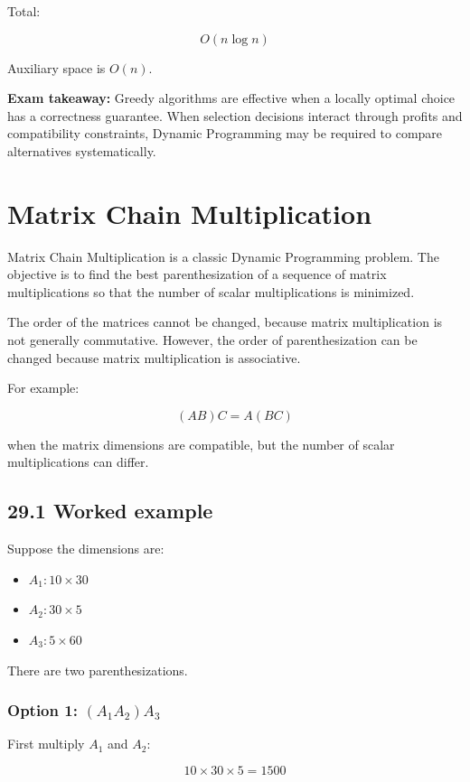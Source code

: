 Total:


\[
\boxed{O(n\log n)}
\]


Auxiliary space is $O(n)$.

\textbf{Exam takeaway:} Greedy algorithms are effective when a locally optimal choice has a correctness guarantee. When selection decisions interact through profits and compatibility constraints, Dynamic Programming may be required to compare alternatives systematically.

\section{Matrix Chain Multiplication}

Matrix Chain Multiplication is a classic Dynamic Programming problem. The objective is to find the best parenthesization of a sequence of matrix multiplications so that the number of scalar multiplications is minimized.

The order of the matrices cannot be changed, because matrix multiplication is not generally commutative. However, the order of parenthesization can be changed because matrix multiplication is associative.

For example:


\[
(AB)C=A(BC)
\]


when the matrix dimensions are compatible, but the number of scalar multiplications can differ.

\subsection{29.1 Worked example}

Suppose the dimensions are:

\begin{itemize}
    \item $A_1: 10\times30$
    \item $A_2: 30\times5$
    \item $A_3: 5\times60$
\end{itemize}

There are two parenthesizations.

\subsubsection{\textbf{Option 1: }$(A_1A_2)A_3$}

First multiply $A_1$ and $A_2$:


\[
10\times30\times5=1500
\]



